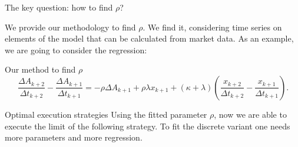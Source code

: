 \documentclass[]{beamer}
\begin{document}
\begin{frame}[t]
\begin{columns}[t]
\begin{column}{\onecolwid}
        \begin{block}{The key question: how to find $\rho$?}
        
            We provide our methodology to find $\rho$. We find it, considering time series on elements of the model 
            that can be calculated from market data. As an example, we are going to consider the regression:
            \begin{alertblock}{Our method to find $\rho$}
                \begin{equation*}
                    \frac{\Delta A_{k+2}}{\Delta t_{k+2}} - \frac{\Delta A_{k+1}}{\Delta t_{k+1}} 
            = - \rho \Delta A_{k+1} + \rho \lambda x_{k+1} + (\kappa + \lambda) (\frac{x_{k+2}}{\Delta t_{k+2}} - \frac{x_{k+1}}{\Delta t_{k+1}}).
                \end{equation*}
            \end{alertblock}
        \end{block}

        \begin{block}{Optimal execution strategies }
            Using the fitted parameter $\rho$, now we are able to execute the limit of the following strategy.
            To fit the discrete variant one needs more parameters and more regression. 


\end{block}
\end{column}
\end{columns}
\end{frame}
\end{document}
